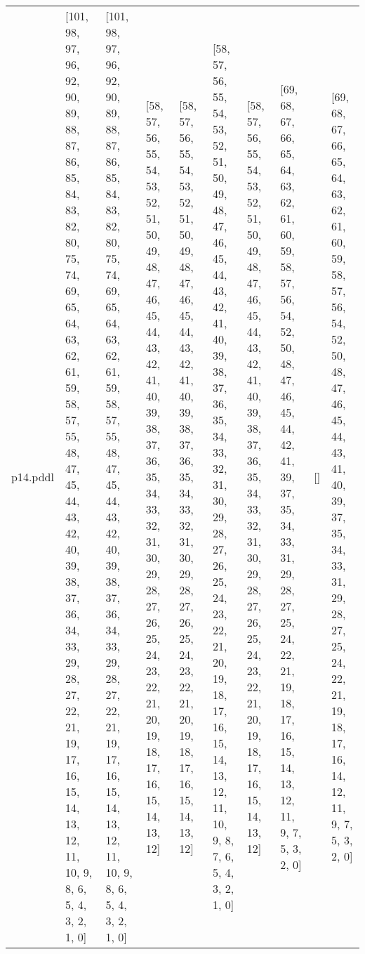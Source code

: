 \documentclass{article}
\begin{document}
\begin{tabular}{@{}lrrrrrrrrr@{}}
p14.pddl & \multicolumn{1}{|l|}{[101, 98, 97, 96, 92, 90, 89, 88, 87, 86, 85, 84, 83, 82, 80, 75, 74, 69, 65, 64, 63, 62, 61, 59, 58, 57, 55, 48, 47, 45, 44, 43, 42, 40, 39, 38, 37, 36, 34, 33, 29, 28, 27, 22, 21, 19, 17, 16, 15, 14, 13, 12, 11, 10, 9, 8, 6, 5, 4, 3, 2, 1, 0]} & \multicolumn{1}{|l|}{[101, 98, 97, 96, 92, 90, 89, 88, 87, 86, 85, 84, 83, 82, 80, 75, 74, 69, 65, 64, 63, 62, 61, 59, 58, 57, 55, 48, 47, 45, 44, 43, 42, 40, 39, 38, 37, 36, 34, 33, 29, 28, 27, 22, 21, 19, 17, 16, 15, 14, 13, 12, 11, 10, 9, 8, 6, 5, 4, 3, 2, 1, 0]} & \multicolumn{1}{|l|}{[58, 57, 56, 55, 54, 53, 52, 51, 50, 49, 48, 47, 46, 45, 44, 43, 42, 41, 40, 39, 38, 37, 36, 35, 34, 33, 32, 31, 30, 29, 28, 27, 26, 25, 24, 23, 22, 21, 20, 19, 18, 17, 16, 15, 14, 13, 12]} & \multicolumn{1}{|l|}{[58, 57, 56, 55, 54, 53, 52, 51, 50, 49, 48, 47, 46, 45, 44, 43, 42, 41, 40, 39, 38, 37, 36, 35, 34, 33, 32, 31, 30, 29, 28, 27, 26, 25, 24, 23, 22, 21, 20, 19, 18, 17, 16, 15, 14, 13, 12]} & \multicolumn{1}{|l|}{[58, 57, 56, 55, 54, 53, 52, 51, 50, 49, 48, 47, 46, 45, 44, 43, 42, 41, 40, 39, 38, 37, 36, 35, 34, 33, 32, 31, 30, 29, 28, 27, 26, 25, 24, 23, 22, 21, 20, 19, 18, 17, 16, 15, 14, 13, 12, 11, 10, 9, 8, 7, 6, 5, 4, 3, 2, 1, 0]} & \multicolumn{1}{|l|}{[58, 57, 56, 55, 54, 53, 52, 51, 50, 49, 48, 47, 46, 45, 44, 43, 42, 41, 40, 39, 38, 37, 36, 35, 34, 33, 32, 31, 30, 29, 28, 27, 26, 25, 24, 23, 22, 21, 20, 19, 18, 17, 16, 15, 14, 13, 12]} & \multicolumn{1}{|l|}{[69, 68, 67, 66, 65, 64, 63, 62, 61, 60, 59, 58, 57, 56, 54, 52, 50, 48, 47, 46, 45, 44, 42, 41, 39, 37, 35, 34, 33, 31, 29, 28, 27, 25, 24, 22, 21, 19, 18, 17, 16, 15, 14, 13, 12, 11, 9, 7, 5, 3, 2, 0]} & \multicolumn{1}{|l|}{[]} & \multicolumn{1}{|l|}{[69, 68, 67, 66, 65, 64, 63, 62, 61, 60, 59, 58, 57, 56, 54, 52, 50, 48, 47, 46, 45, 44, 43, 41, 40, 39, 37, 35, 34, 33, 31, 29, 28, 27, 25, 24, 22, 21, 19, 18, 17, 16, 14, 12, 11, 9, 7, 5, 3, 2, 0]} \\

\end{tabular}
\end{document}
